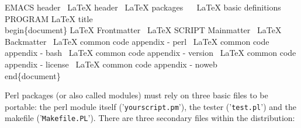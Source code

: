 \documentclass[11pt]{article}
\def\nwendcode{\endtrivlist \endgroup} %
\let\nwdocspar=\par                    %
\begin{document}
\nwenddocs{}\endmoddef
\LA{}EMACS header~{\nwtagstyle{}}\RA{}
\LA{}LaTeX header~{\nwtagstyle{}}\RA{}
\LA{}LaTeX packages~{\nwtagstyle{}}\RA{}
\ %
\LA{}LaTeX basic definitions~{\nwtagstyle{}}\RA{}
\LA{}PROGRAM LaTeX title~{\nwtagstyle{}}\RA{}
%
%
\\begin\{document\}
%
\LA{}LaTeX Frontmatter~{\nwtagstyle{}}\RA{}
\LA{}LaTeX SCRIPT Mainmatter~{\nwtagstyle{}}\RA{}
\LA{}LaTeX Backmatter~{\nwtagstyle{}}\RA{}
%
\LA{}LaTeX common code appendix - perl~{\nwtagstyle{}}\RA{}
\LA{}LaTeX common code appendix - bash~{\nwtagstyle{}}\RA{}
\LA{}LaTeX common code appendix - version~{\nwtagstyle{}}\RA{}
\LA{}LaTeX common code appendix - license~{\nwtagstyle{}}\RA{}
\LA{}LaTeX common code appendix - noweb~{\nwtagstyle{}}\RA{}
%
\\end\{document\}
%
\nwendcode{}\nwdocspar


Perl packages (or also called modules) must rely on three basic files to be portable: the perl module itself ('{\tt{}your{}script.pm}'), the tester ('{\tt{}test.pl}') and the makefile ('{\tt{}Makefile.PL}'). There are three secondary files within the distribution: 
\end{document}
